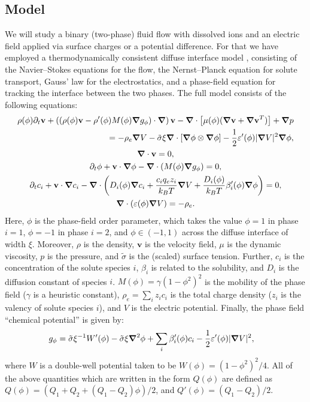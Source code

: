 \documentclass[a4paper,10pt]{article}
\renewcommand{\v}[1]{\mathbf{#1}}
\renewcommand{\v}[1]{\ensuremath{\mathbf{#1}}} %
\newcommand{\gv}[1]{\ensuremath{\mbox{\boldmath$ #1 $}}}
\newcommand{\grad}[1]{\gv{\nabla} #1} %
\renewcommand{\div}[1]{\gv{\nabla} \cdot #1} %
\newcommand{\laplacian}[1]{\grad^2 #1}
\newcommand{\pdt}[1]{\partial_t #1}
\begin{document}
\subsection*{Model}
We will study a binary (two-phase) fluid flow with dissolved ions and an electric field applied via surface charges or a potential difference.
For that we have employed a thermodynamically consistent diffuse interface model \cite{abels2012}, consisting of the Navier--Stokes equations for the flow, the Nernst--Planck equation for solute transport, Gauss' law for the electrostatics, and a phase-field equation for tracking the interface between the two phases.
The full model consists of the following equations:
\begin{gather}
  \begin{split}
  \rho(\phi) \pdt \v v + \left( \left(\rho(\phi) \v v - \rho'(\phi) M(\phi) \grad g_\phi  \right) \cdot \grad \right) \v v - \div \left[  \mu(\phi)(\grad \v v + \grad \v v ^T) \right] + \grad p \\
  = - \rho_e \grad V - \tilde \sigma \xi\div \left[ \grad \phi \otimes \grad \phi \right] - \frac 1 2 \varepsilon'(\phi) | \grad V |^2 \grad \phi,
  \end{split}\\
  \div \v v = 0, \\
  \pdt \phi + \v v \cdot \grad \phi - \div(M(\phi) \grad g_\phi ) = 0, \\
  \pdt c_i + \v v \cdot \grad c_i - \div \left( D_{i} (\phi) \grad c_i + \frac{c_i q_e  z_i}{k_B T} \grad V +\frac{D_i(\phi)}{k_B T}\beta_i'(\phi) \grad \phi \right) = 0, \\
  \div ( \varepsilon (\phi) \grad V ) = - \rho_e.
\end{gather}
Here, $\phi$ is the phase-field order parameter, which takes the value $\phi = 1$ in phase $i=1$, $\phi = -1$ in phase $i=2$, and $\phi \in (-1, 1)$ across the diffuse interface of width $\xi$.
Moreover, $\rho$ is the density, $\v v$ is the velocity field, $\mu$ is the dynamic viscosity, $p$ is the pressure, and $\tilde{\sigma}$ is the (scaled) surface tension.
Further, $c_i$ is the concentration of the solute species $i$, $\beta_i$ is related to the solubility, and $D_i$ is the diffusion constant of species $i$. $M(\phi)= \gamma (1 - \phi^2)^2$ is the mobility of the phase field ($\gamma$ is a heuristic constant), $\rho_e = \sum_i z_i c_i$ is the total charge density ($z_i$ is the valency of solute species $i$), and $V$ is the electric potential. Finally, the phase field ``chemical potential'' is given by:
\begin{align}
 g_\phi &= \tilde\sigma\xi^{-1}W'(\phi) - \tilde\sigma\xi\laplacian\phi + \sum_i \beta_i'(\phi) c_i - \frac 1 2 \varepsilon'(\phi) | \grad V |^2 ,
\end{align}
where $W$ is a double-well potential taken to be $W(\phi) = (1 - \phi^2)^2/4$.
All of the above quantities which are written in the form $Q(\phi)$ are defined as $Q(\phi) = (Q_1+Q_2 + (Q_1-Q_2)\phi)/2$, and $Q'(\phi) = (Q_1-Q_2)/2$.
\end{document}
